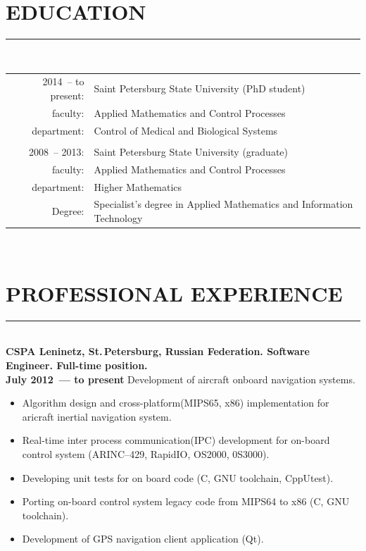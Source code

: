 \documentclass[a4paper,oneside,12pt]{article}
\newcommand{\cvpart}[1]{%
\vspace{-0.9em}%
\section*{\Large\bfseries\MakeTextUppercase{#1}}%
\vspace{-1.7em}%
\rule{\linewidth}{0.3em}\\[-0.8em]%
}
\begin{document}
\cvpart{Education}

\begin{tabularx}{\linewidth}{rX}
2014~-- to present:& Saint Petersburg State University (PhD student)\\
           faculty:& Applied Mathematics and Control Processes\\
        department:& Control of Medical and Biological Systems\\
                   & \\
      2008~-- 2013:& Saint Petersburg State University (graduate)\\
           faculty:& Applied Mathematics and Control Processes\\
        department:& Higher Mathematics\\
            Degree:& Specialist's degree in Applied Mathematics and Information Technology
\end{tabularx}

~\\

\cvpart{Professional Experience}

{\bf
CSPA Leninetz, St.\,Petersburg, Russian Federation. Software Engineer. Full-time position.\\
July 2012~--- to present
}
Development of aircraft onboard navigation systems.

\begin{itemize}
    \item Algorithm design and cross-platform(MIPS65, x86)  implementation for aricraft inertial navigation system.
    \item Real-time inter process communication(IPC) development for on-board control system (ARINC--429, RapidIO, OS2000, 0S3000).
    \item Developing unit tests for on board code (C, GNU toolchain, CppUtest).
    \item Porting on-board control system legacy code from MIPS64 to x86 (C, GNU toolchain).
    \item Development of GPS navigation client application (Qt). 
\end{itemize}

~\\[-1em]
\end{document}
